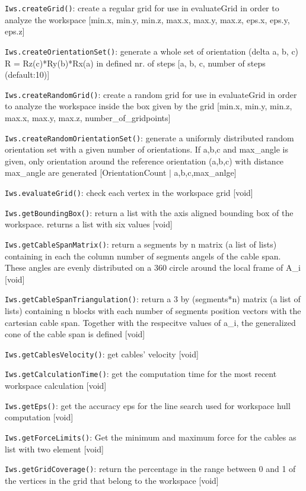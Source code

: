 \documentclass[11pt,a4paper,onepage,openany]{book}
\begin{document}
\texttt{Iws.createGrid()}: create a regular grid for use in evaluateGrid in order to analyze the workspace [min.x, min.y, min.z, max.x, max.y, max.z, eps.x, eps.y, eps.z]

\texttt{Iws.createOrientationSet()}: generate a whole set of orientation (delta a, b, c) R = Rz(c)*Ry(b)*Rx(a) in defined nr. of steps [a, b, c, number of steps (default:10)]

\texttt{Iws.createRandomGrid()}: create a random grid for use in evaluateGrid in order to analyze the workspace inside the box given by the grid [min.x, min.y, min.z, max.x, max.y, max.z, number\_of\_gridpoints]

\texttt{Iws.createRandomOrientationSet()}: generate a uniformly distributed random orientation set with a given number of orientations. If a,b,c and max\_angle is given, only orientation around the reference orientation (a,b,c) with distance max\_angle are generated [OrientationCount $|$ a,b,c,max\_anlge]

\texttt{Iws.evaluateGrid()}: check each vertex in the workspace grid [void]

\texttt{Iws.getBoundingBox()}: return a list with the axis aligned bounding box of the workspace. returns a list with six values [void]

\texttt{Iws.getCableSpanMatrix()}: return a segments by n matrix (a list of lists) containing in each the column number of segments angels of the cable span. These angles are evenly distributed on a 360 circle around the local frame of A\_i [void]

\texttt{Iws.getCableSpanTriangulation()}: return a 3 by (segments*n) matrix (a list of lists) containing n blocks with each number of segments position vectors with the cartesian cable span. Together with the respecitve values of a\_i, the generalized cone of the cable span is defined [void]

\texttt{Iws.getCablesVelocity()}: get cables' velocity [void]

\texttt{Iws.getCalculationTime()}: get the computation time for the most recent workspace calculation [void]

\texttt{Iws.getEps()}: get the accuracy eps for the line search used for workspace hull computation [void]

\texttt{Iws.getForceLimits()}: Get the minimum and maximum force for the cables as list with two element [void]

\texttt{Iws.getGridCoverage()}: return the percentage in the range between 0 and 1 of the vertices in the grid that belong to the workspace [void]
\end{document}
